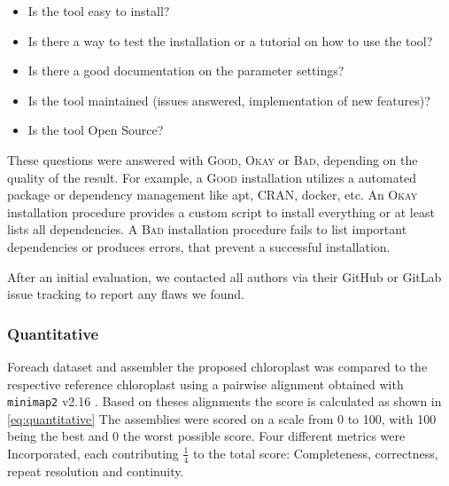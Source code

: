 \documentclass{bmcart}
\newcommand{\ok}{\textsc{Okay}}
\newcommand{\bad}{\textsc{Bad}}
\newcommand{\good}{\textsc{Good}}
\begin{document}
\begin{itemize}
    \item Is the tool easy to install? 
    \item Is there a way to test the installation or a tutorial on how to use the tool? 
    \item Is there a good documentation on the parameter settings? 
    \item Is the tool maintained (issues answered, implementation of new features)? 
    \item Is the tool Open Source?
\end{itemize}

These questions were answered with \good{}, \ok{} or \bad{}, depending on the quality of the result. 
For example, a \good{} installation utilizes a automated package or dependency management like apt,
CRAN, docker, etc. An \ok{} installation procedure provides a custom script to install everything
or at least lists all dependencies. A \bad{} installation procedure fails to list important dependencies
or produces errors, that prevent a successful installation. 

After an initial evaluation, we contacted all authors via their GitHub or GitLab issue tracking to
report any flaws we found.

\subsubsection*{Quantitative}

%



Foreach dataset and assembler the proposed chloroplast was compared to the respective reference chloroplast using a pairwise alignment obtained with \texttt{minimap2} v2.16 \cite{li2018minimap2}. Based on theses alignments the score is calculated as shown in \cref{eq:quantitative}
The assemblies were scored on a scale from 0 to 100, with 100 being the best and 0 the worst possible score. Four different metrics were Incorporated, each contributing  $\frac{1}{4}$ to the total score: Completeness, correctness, repeat resolution and continuity.
\end{document}

